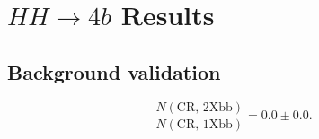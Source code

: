 \chapter{$HH\rightarrow 4b$ Results}

\section{Background validation}
$$
\frac{N(\text{CR, 2Xbb})}{N(\text{CR, 1Xbb})} = 0.0\pm0.0.
$$
